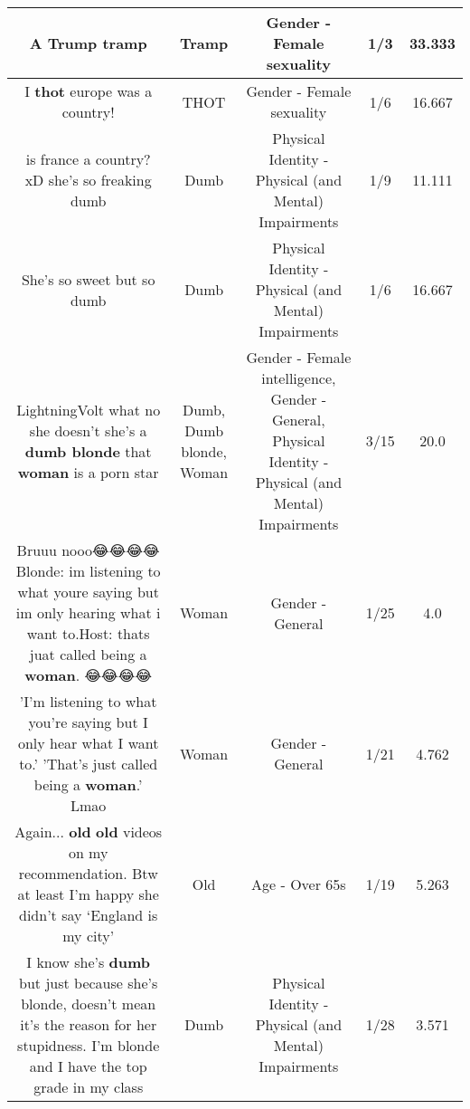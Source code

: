 \documentclass[11pt]{article}
\newlength\mylength
\begin{document}
\begin{center}
\begin{longtable}{|C{.65\mylength}|C{.30\mylength}|C{.12\mylength}|C{.12\mylength}|C{.12\mylength}|}
  \small A Trump tramp\normalsize   & Tramp & Gender - Female sexuality & 1/3 & 33.333 \\  \hline
  \small I \textbf{thot} europe was a country!\normalsize   & THOT & Gender - Female sexuality & 1/6 & 16.667 \\  \hline
  \small is france a country? xD she's so freaking dumb\normalsize   & Dumb & Physical Identity - Physical (and Mental) Impairments & 1/9 & 11.111 \\  \hline
  \small She's so sweet but so dumb\normalsize   & Dumb & Physical Identity - Physical (and Mental) Impairments & 1/6 & 16.667 \\  \hline
  \small LightningVolt what no she doesn't she's a \textbf{d\textbf{umb} blonde} that \textbf{woman} is a porn star\normalsize   & Dumb, Dumb blonde, Woman & Gender - Female intelligence, Gender - General, Physical Identity - Physical (and Mental) Impairments & 3/15 & 20.0 \\  \hline
  \small Bruuu nooo😂😂😂😂 Blonde: im listening to what youre saying but im only hearing what i want to.Host: thats juat called being a \textbf{woman}. 😂😂😂😂\normalsize   & Woman & Gender - General & 1/25 & 4.0 \\  \hline
  \small 'I'm listening to what you're saying but I only hear what I want to.' 'That's just called being a \textbf{woman}.' Lmao\normalsize   & Woman & Gender - General & 1/21 & 4.762 \\  \hline
  \small Again... \textbf{old} \textbf{old} videos on my recommendation.  Btw at least I'm happy she didn't say ‘England is my city'\normalsize   & Old & Age - Over 65s & 1/19 & 5.263 \\  \hline
  \small I know she's \textbf{dumb} but just because she's blonde, doesn't mean it's the reason for her stupidness. I'm blonde and I have the top grade in my class\normalsize   & Dumb & Physical Identity - Physical (and Mental) Impairments & 1/28 & 3.571 \\  \hline

\end{longtable}
\end{center}
\end{document}
